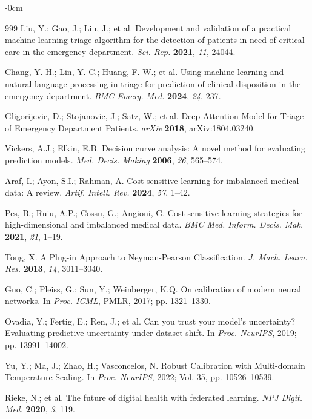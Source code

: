 \documentclass[journal,article,submit,pdftex,moreauthors]{Definitions/mdpi}
\begin{document}
\begin{adjustwidth}{-\extralength}{0cm}
\begin{thebibliography}{999}
Liu, Y.; Gao, J.; Liu, J.; et al. Development and validation of a practical machine-learning triage algorithm for the detection of patients in need of critical care in the emergency department. \textit{Sci. Rep.} \textbf{2021}, \textit{11}, 24044.

Chang, Y.-H.; Lin, Y.-C.; Huang, F.-W.; et al. Using machine learning and natural language processing in triage for prediction of clinical disposition in the emergency department. \textit{BMC Emerg. Med.} \textbf{2024}, \textit{24}, 237.

Gligorijevic, D.; Stojanovic, J.; Satz, W.; et al. Deep Attention Model for Triage of Emergency Department Patients. \textit{arXiv} \textbf{2018}, arXiv:1804.03240.

Vickers, A.J.; Elkin, E.B. Decision curve analysis: A novel method for evaluating prediction models. \textit{Med. Decis. Making} \textbf{2006}, \textit{26}, 565--574.

Araf, I.; Ayon, S.I.; Rahman, A. Cost-sensitive learning for imbalanced medical data: A review. \textit{Artif. Intell. Rev.} \textbf{2024}, \textit{57}, 1--42.

Pes, B.; Ruiu, A.P.; Cossu, G.; Angioni, G. Cost-sensitive learning strategies for high-dimensional and imbalanced medical data. \textit{BMC Med. Inform. Decis. Mak.} \textbf{2021}, \textit{21}, 1--19.

Tong, X. A Plug-in Approach to Neyman-Pearson Classification. \textit{J. Mach. Learn. Res.} \textbf{2013}, \textit{14}, 3011--3040.

Guo, C.; Pleiss, G.; Sun, Y.; Weinberger, K.Q. On calibration of modern neural networks. In \textit{Proc. ICML}, PMLR, 2017; pp. 1321--1330.

Ovadia, Y.; Fertig, E.; Ren, J.; et al. Can you trust your model's uncertainty? Evaluating predictive uncertainty under dataset shift. In \textit{Proc. NeurIPS}, 2019; pp. 13991--14002.

Yu, Y.; Ma, J.; Zhao, H.; Vasconcelos, N. Robust Calibration with Multi-domain Temperature Scaling. In \textit{Proc. NeurIPS}, 2022; Vol. 35, pp. 10526--10539.

Rieke, N.; et al. The future of digital health with federated learning. \textit{NPJ Digit. Med.} \textbf{2020}, \textit{3}, 119.


\end{thebibliography}
\end{adjustwidth}
\end{document}
